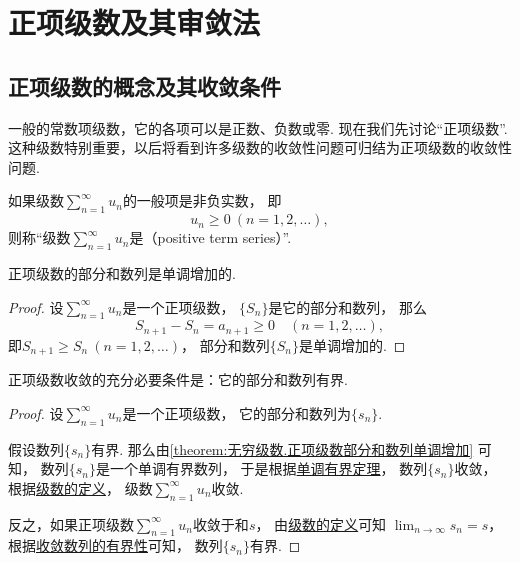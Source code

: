 \section{正项级数及其审敛法}
\subsection{正项级数的概念及其收敛条件}
一般的常数项级数，它的各项可以是正数、负数或零.
现在我们先讨论“正项级数”.
这种级数特别重要，以后将看到许多级数的收敛性问题可归结为正项级数的收敛性问题.

\begin{definition}
如果级数\(\sum_{n=1}^\infty u_n\)的一般项是非负实数，
即\[
	u_n\geq0\ (n=1,2,\dotsc),
\]
则称“级数\(\sum_{n=1}^\infty u_n\)是（positive term series）”.
\end{definition}

\begin{property}\label{theorem:无穷级数.正项级数部分和数列单调增加}
正项级数的部分和数列是单调增加的.
\begin{proof}
设\(\sum_{n=1}^\infty u_n\)是一个正项级数，
\(\{S_n\}\)是它的部分和数列，
那么\[
	S_{n+1} - S_n = a_{n+1} \geq 0
	\quad(n=1,2,\dotsc),
\]
即\(S_{n+1} \geq S_n\ (n=1,2,\dotsc)\)，
部分和数列\(\{S_n\}\)是单调增加的.
\end{proof}
\end{property}

\begin{theorem}\label{theorem:无穷级数.正项级数收敛的充分必要条件}
正项级数收敛的充分必要条件是：它的部分和数列有界.
\begin{proof}
设\(\sum_{n=1}^\infty u_n\)是一个正项级数，
它的部分和数列为\(\{s_n\}\).

假设数列\(\{s_n\}\)有界.
那么由\cref{theorem:无穷级数.正项级数部分和数列单调增加} 可知，
数列\(\{s_n\}\)是一个单调有界数列，
于是根据\hyperref[theorem:极限.数列的单调有界定理]{单调有界定理}，
数列\(\{s_n\}\)收敛，
根据\hyperref[definition:无穷级数.常数项级数的定义]{级数的定义}，
级数\(\sum_{n=1}^\infty u_n\)收敛.

反之，如果正项级数\(\sum_{n=1}^\infty u_n\)收敛于和\(s\)，
由\hyperref[definition:无穷级数.常数项级数的定义]{级数的定义}可知
\(\lim_{n\to\infty} s_n = s\)，
根据\hyperref[theorem:极限.收敛数列的有界性]{收敛数列的有界性}可知，
数列\(\{s_n\}\)有界.
\end{proof}
\end{theorem}

